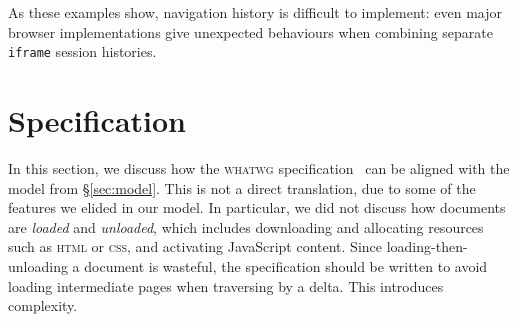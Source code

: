 \documentclass{notes}
\begin{document}
As these examples show, navigation history is difficult to implement: even major
browser implementations give unexpected behaviours when combining separate
\verb|iframe| session histories.

\section{Specification}

In this section, we discuss how the \textsc{whatwg}
specification~\cite[\S7.7.2]{whatwg} can be aligned with the model
from \S\ref{sec:model}. This is not a direct translation, due to some
of the features we elided in our model. In particular, we did not
discuss how documents are \emph{loaded} and \emph{unloaded}, which
includes downloading and allocating resources such as \textsc{html} or
\textsc{css}, and activating JavaScript content. Since
loading-then-unloading a document is wasteful, the specification
should be written to avoid loading intermediate pages when traversing
by a delta. This introduces complexity.
\end{document}
